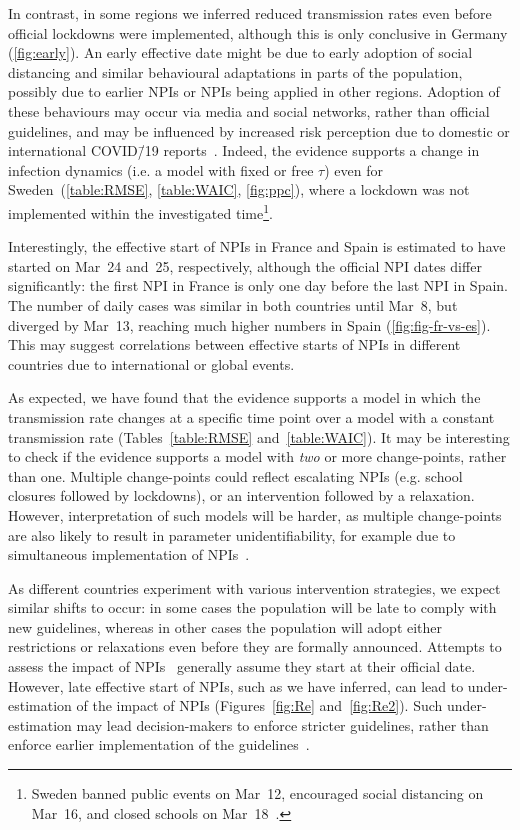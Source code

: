 \documentclass[12pt]{extarticle}
\newcommand{\covid}{COVID\=/19 }
\begin{document}
In contrast, in some regions we inferred reduced transmission rates even before official lockdowns were implemented, although this is only conclusive in Germany (\autoref{fig:early}).
An early effective date might be due to early adoption of social distancing and similar behavioural adaptations in parts of the population, possibly due to earlier NPIs or NPIs being applied in other regions.
Adoption of these behaviours may occur via media and social networks, rather than official guidelines, and may be influenced by increased risk perception due to domestic or international \covid reports~\citep{Arthur2020}.
Indeed, the evidence supports a change in infection dynamics (i.e. a model with fixed or free $\tau$) even for Sweden~(\autoref{table:RMSE}, \autoref{table:WAIC}, \autoref{fig:ppc}), where a lockdown was not implemented within the investigated time\footnote{Sweden banned public events on Mar~12, encouraged social distancing on Mar~16, and closed schools on Mar~18~\citep{Flaxman2020}.}.

Interestingly, the effective start of NPIs in France and Spain is estimated to have started on Mar~24 and~25, respectively,
although the official NPI dates differ significantly: the first NPI in France is only one day before the last NPI in Spain.
The number of daily cases was similar in both countries until Mar~8, but diverged by Mar~13, reaching much higher numbers in Spain (\autoref{fig:fig-fr-vs-es}).
This may suggest correlations between effective starts of NPIs in different countries due to international or global events.

As expected, we have found that the evidence supports a model in which the transmission rate changes at a specific time point over a model with a constant transmission rate (Tables~\ref{table:RMSE} and~\ref{table:WAIC}).
It may be interesting to check if the evidence supports a model with \emph{two} or more change-points, rather than one. 
Multiple change-points could reflect escalating NPIs (e.g. school closures followed by lockdowns), or an intervention followed by a relaxation.
However, interpretation of such models will be harder, as multiple change-points are also likely to result in parameter unidentifiability, for example due to simultaneous implementation of NPIs~\citep{Flaxman2020}.

As different countries experiment with various intervention strategies, we expect similar shifts to occur: in some cases the population will be late to comply with new guidelines, whereas in other cases the population will adopt either restrictions or relaxations even before they are formally announced.
Attempts to assess the impact of NPIs~\citep{Banholzer2020,Flaxman2020} generally assume they start at their official date.
However, late effective start of NPIs, such as we have inferred, can lead to under-estimation of the impact of NPIs (Figures~\ref{fig:Re} and~\ref{fig:Re2}).
Such under-estimation may lead decision-makers to enforce stricter guidelines, rather than enforce earlier implementation of the guidelines~\citep{Pei2020a}.
\end{document}
